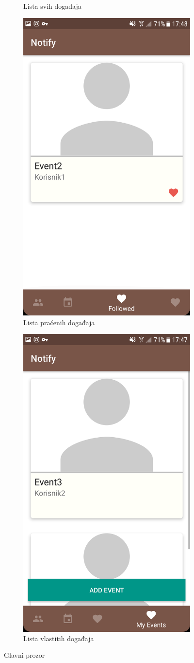 \documentclass[times, utf8, zavrsni]{fer}
\begin{document}
{\begin{figure}
\begin{subfigure}{0.5\linewidth}
    \caption{Lista svih događaja}
    \label{fig:event-list-all-image}
\end{subfigure}
\begin{subfigure}{0.5\linewidth}
	\centering    
    \includegraphics[width=0.45\linewidth]{img/ss-event-list-followed.png} 
    \caption{Lista praćenih događaja}
    \label{fig:event-list-followed-image}
\end{subfigure}%
\begin{subfigure}{0.5\linewidth}
	\centering
    \includegraphics[width=0.45\linewidth]{img/ss-event-list-my.png} 
    \caption{Lista vlastitih događaja}
    \label{fig:event-list-my-image}
\end{subfigure}%
\caption{Glavni prozor}
\label{fig:main-activity-image}
\end{figure}

}
\end{document}
